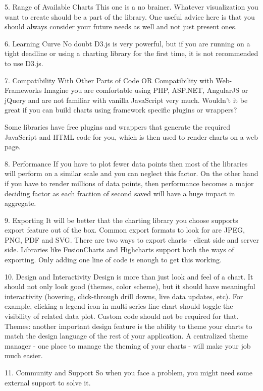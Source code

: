 5. Range of Available Charts
This one is a no brainer. Whatever visualization you want to create should be a part of the library. One useful advice here is that you should always consider your future needs as well and not just present ones. 


6. Learning Curve
No doubt D3.js is very powerful, but if you are running on a tight deadline or using a charting library for the first time, it is not recommended to use D3.js.

7. Compatibility With Other Parts of Code OR Compatibility with Web-Frameworks
Imagine you are comfortable using PHP, ASP.NET, AngularJS or jQuery and are not familiar with vanilla JavaScript very much. Wouldn’t it be great if you can build charts using framework specific plugins or wrappers?

Some libraries have free plugins and wrappers that generate the required JavaScript and HTML code for you, which is then used to render charts on a web page.

8. Performance
If you have to plot fewer data points then most of the libraries will perform on a similar scale and you can neglect this factor. On the other hand if you have to render millions of data points, then performance becomes a major deciding factor as each fraction of second saved will have a huge impact in aggregate.

9. Exporting
It will be better that the charting library you choose supports export feature out of the box. Common export formats to look for are JPEG, PNG, PDF and SVG. There are two ways to export charts - client side and server side. Libraries like FusionCharts and Highcharts support both the ways of exporting. Only adding one line of code is enough to get this working. 

10. Design and Interactivity
Design is more than just look and feel of a chart. It should not only look good (themes, color scheme), but it should have meaningful interactivity (hovering, click-through drill downs, live data updates, etc). For example, clicking a legend icon in multi-series line chart should toggle the visibility of related data plot. Custom code should not be required for that. Themes: another important design feature is the ability to theme your charts to match the design language of the rest of your application. A centralized theme manager - one place to manage the theming of your charts - will make your job much easier.


11. Community and Support
So when you face a problem, you might need some external support to solve it. 

